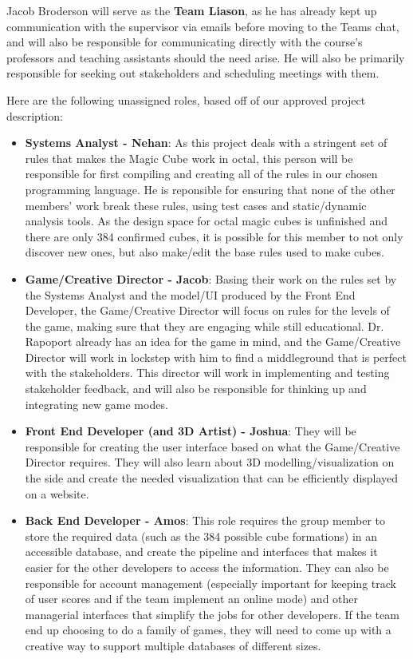 \documentclass{article}
\begin{document}
Jacob Broderson will serve as the \textbf{Team Liason}, as he has already kept up communication with the supervisor via emails before moving to the Teams chat, and will also be responsible for communicating directly with the course's professors and teaching assistants should the need arise. He will also be primarily responsible for seeking out stakeholders and scheduling meetings with them.

Here are the following unassigned roles, based off of our approved project description:
\begin {itemize}
\item \textbf{Systems Analyst - Nehan}: As this project deals with a stringent set of rules that makes the Magic Cube work in octal, this person will be responsible for first compiling and creating all of the rules in our chosen programming language. He is reponsible for ensuring that none of the other members' work break these rules, using test cases and static/dynamic analysis tools. As the design space for octal magic cubes is unfinished and there are only 384 confirmed cubes, it is possible for this member to not only discover new ones, but also make/edit the base rules used to make cubes.
\item \textbf{Game/Creative Director - Jacob}: Basing their work on the rules set by the Systems Analyst and the model/UI produced by the Front End Developer, the Game/Creative Director will focus on rules for the levels of the game, making sure that they are engaging while still educational. Dr. Rapoport already has an idea for the game in mind, and the Game/Creative Director will work in lockstep with him to find a middleground that is perfect with the stakeholders. This director will work in implementing and testing stakeholder feedback, and will also be responsible for thinking up and integrating new game modes.
\item \textbf{Front End Developer (and 3D Artist) - Joshua}: They will be responsible for creating the user interface based on what the Game/Creative Director requires. They will also learn about 3D modelling/visualization on the side and create the needed visualization that can be efficiently displayed on a website.
\item \textbf{Back End Developer - Amos}: This role requires the group member to store the required data (such as the 384 possible cube formations) in an accessible database, and create the pipeline and interfaces that makes it easier for the other developers to access the information. They can also be responsible for account management (especially important for keeping track of user scores and if the team implement an online mode) and other managerial interfaces that simplify the jobs for other developers. If the team end up choosing to do a family of games, they will need to come up with a creative way to support multiple databases of different sizes.

\end{itemize}
\end{document}
